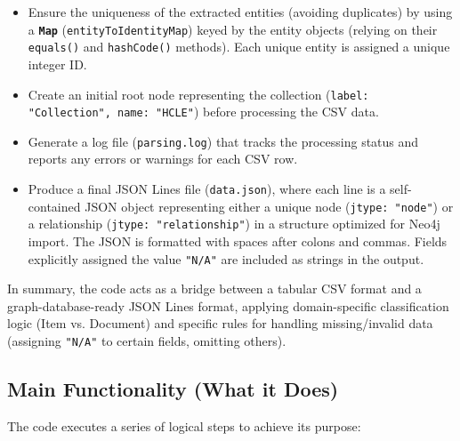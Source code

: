 \begin{itemize}
    \item Ensure the uniqueness of the extracted entities (avoiding duplicates) by using a \textbf{\texttt{Map}} (\texttt{entityToIdentityMap}) keyed by the entity objects (relying on their \texttt{equals()} and \texttt{hashCode()} methods). Each unique entity is assigned a unique integer ID.
    \item Create an initial root node representing the collection (\texttt{label: "Collection", name: "HCLE"}) before processing the CSV data.
    \item Generate a log file (\texttt{parsing.log}) that tracks the processing status and reports any errors or warnings for each CSV row.
    \item Produce a final JSON Lines file (\texttt{data.json}), where each line is a self-contained JSON object representing either a unique node (\texttt{jtype: "node"}) or a relationship (\texttt{jtype: "relationship"}) in a structure optimized for Neo4j import. The JSON is formatted with spaces after colons and commas. Fields explicitly assigned the value \texttt{"N/A"} are included as strings in the output.
\end{itemize}
In summary, the code acts as a bridge between a tabular CSV format and a graph-database-ready JSON Lines format, applying domain-specific classification logic (Item vs. Document) and specific rules for handling missing/invalid data (assigning \texttt{"N/A"} to certain fields, omitting others).

\subsection{Main Functionality (What it Does)}
The code executes a series of logical steps to achieve its purpose:

